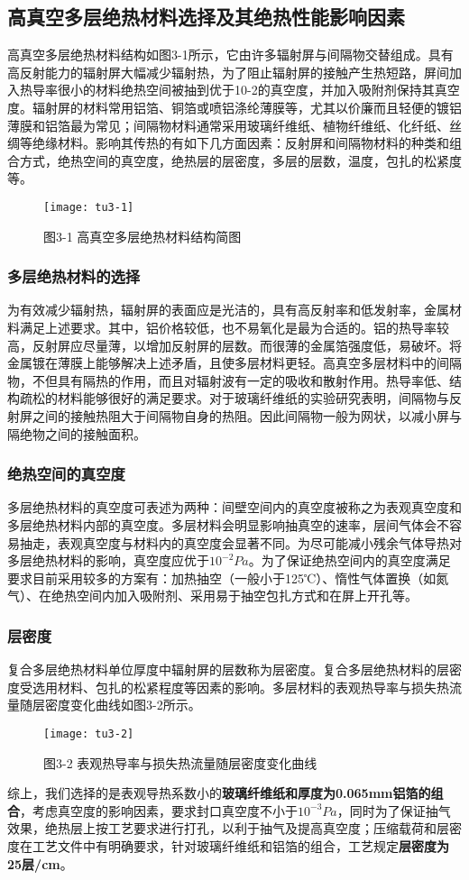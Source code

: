 \documentclass[UTF8,a4paper]{ctexart}
\begin{document}
	\subsection{高真空多层绝热材料选择及其绝热性能影响因素}
	高真空多层绝热材料结构如图3-1所示，它由许多辐射屏与间隔物交替组成。具有高反射能力的辐射屏大幅减少辐射热，为了阻止辐射屏的接触产生热短路，屏间加入热导率很小的材料绝热空间被抽到优于10-2的真空度，并加入吸附剂保持其真空度。辐射屏的材料常用铝箔、铜箔或喷铝涤纶薄膜等，尤其以价廉而且轻便的镀铝薄膜和铝箔最为常见；间隔物材料通常采用玻璃纤维纸、植物纤维纸、化纤纸、丝绸等绝缘材料。影响其传热的有如下几方面因素：反射屏和间隔物材料的种类和组合方式，绝热空间的真空度，绝热层的层密度，多层的层数，温度，包扎的松紧度等。
	\begin{figure}[H]
		\centering
		\texttt{[image: tu3-1]}
		\caption*{图3-1 高真空多层绝热材料结构简图}
		\label{fig:tu3-1}
	\end{figure}
	\subsubsection{多层绝热材料的选择}
	为有效减少辐射热，辐射屏的表面应是光洁的，具有高反射率和低发射率，金属材料满足上述要求。其中，铝价格较低，也不易氧化是最为合适的。铝的热导率较高，反射屏应尽量薄，以增加反射屏的层数。而很薄的金属箔强度低，易破坏。将金属镀在薄膜上能够解决上述矛盾，且使多层材料更轻。高真空多层材料中的间隔物，不但具有隔热的作用，而且对辐射波有一定的吸收和散射作用。热导率低、结构疏松的材料能够很好的满足要求。对于玻璃纤维纸的实验研究表明，间隔物与反射屏之间的接触热阻大于间隔物自身的热阻。因此间隔物一般为网状，以减小屏与隔绝物之间的接触面积。
	\subsubsection{绝热空间的真空度}
	多层绝热材料的真空度可表述为两种：间壁空间内的真空度被称之为表观真空度和多层绝热材料内部的真空度。多层材料会明显影响抽真空的速率，层间气体会不容易抽走，表观真空度与材料内的真空度会显著不同。为尽可能减小残余气体导热对多层绝热材料的影响，真空度应优于$10^{-2}Pa$。为了保证绝热空间内的真空度满足要求目前采用较多的方案有：加热抽空（一般小于125℃）、惰性气体置换（如氮气）、在绝热空间内加入吸附剂、采用易于抽空包扎方式和在屏上开孔等。
	\subsubsection{层密度}
	复合多层绝热材料单位厚度中辐射屏的层数称为层密度。复合多层绝热材料的层密度受选用材料、包扎的松紧程度等因素的影响。多层材料的表观热导率与损失热流量随层密度变化曲线如图3-2所示。
	\begin{figure}[H]
		\centering
		\texttt{[image: tu3-2]}
		\caption*{图3-2 表观热导率与损失热流量随层密度变化曲线}
		\label{fig:tu3-2}
	\end{figure}
	综上，我们选择的是表观导热系数小的\textbf{玻璃纤维纸和厚度为0.065mm铝箔的组合}，考虑真空度的影响因素，要求封口真空度不小于$10^{-3}Pa$，同时为了保证抽气效果，绝热层上按工艺要求进行打孔，以利于抽气及提高真空度；压缩载荷和层密度在工艺文件中有明确要求，针对玻璃纤维纸和铝箔的组合，工艺规定\textbf{层密度为25层/cm}。
\end{document}
